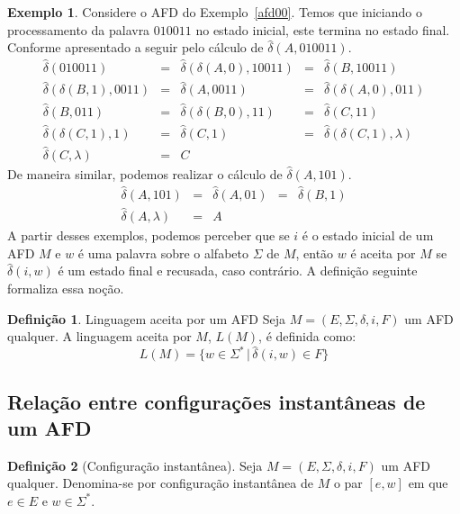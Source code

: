 \documentclass[a4paper]{article}
\theoremstyle{definition}
\newtheorem{Example}{Exemplo}
\newtheorem{Definition}{Definição}
\begin{document}
  \begin{Example}
    Considere o AFD do Exemplo~\ref{afd00}. Temos que iniciando o processamento
    da palavra $010011$ no estado inicial, este termina no estado final.
    Conforme apresentado a seguir pelo cálculo de $\widehat{\delta}(A,010011)$.
    \[
      \begin{array}{lclcl}
       \widehat{\delta}(010011) & = & \widehat{\delta}(\delta(A,0),10011) & = &\widehat{\delta}(B,10011)\\
       \widehat{\delta}(\delta(B,1),0011) & = & \widehat{\delta}(A,0011) & =&\widehat{\delta}(\delta(A,0),011)\\
        \widehat{\delta}(B,011) & = & \widehat{\delta}(\delta(B,0),11) & = &\widehat{\delta}(C,11)\\ 
        \widehat{\delta}(\delta(C,1),1) & = & \widehat{\delta}(C,1) & =&\widehat{\delta}(\delta(C,1),\lambda)\\
        \widehat{\delta}(C,\lambda) & = & C
      \end{array}
    \]
    De maneira similar, podemos realizar o cálculo de $\widehat{\delta}(A,101)$.
    \[
      \begin{array}{lclcl}
        \widehat{\delta}(A,101) & = & \widehat{\delta}(A,01) &=
        &\widehat{\delta}(B,1) \\
        \widehat{\delta}(A,\lambda) & = & A
      \end{array}
    \]
    A partir desses exemplos, podemos perceber que se $i$ é o estado inicial de
    um AFD $M$ e $w$ é uma palavra sobre o alfabeto $\Sigma$ de $M$, então $w$ é
    aceita por $M$ se $\widehat{\delta}(i,w)$ é um estado final e recusada,
    caso contrário. A definição seguinte formaliza essa noção.
  \end{Example}

  \begin{Definition}{Linguagem aceita por um AFD}
    Seja $M = (E,\Sigma,\delta,i, F)$ um AFD qualquer. A linguagem aceita por
    $M$, $L(M)$, é definida como:
    \[
      L(M) = \{w \in \Sigma^*\,|\,\widehat{\delta}(i,w) \in F\}
    \]
  \end{Definition}


  \subsection{Relação entre configurações instantâneas de um AFD}

  \begin{Definition}[Configuração instantânea]
    Seja $M = (E,\Sigma, \delta,i, F)$ um AFD qualquer. Denomina-se por
    configuração instantânea de $M$ o par $[e,w]$ em que $e \in E$ e
    $w \in \Sigma^*$.
  \end{Definition}
\end{document}
